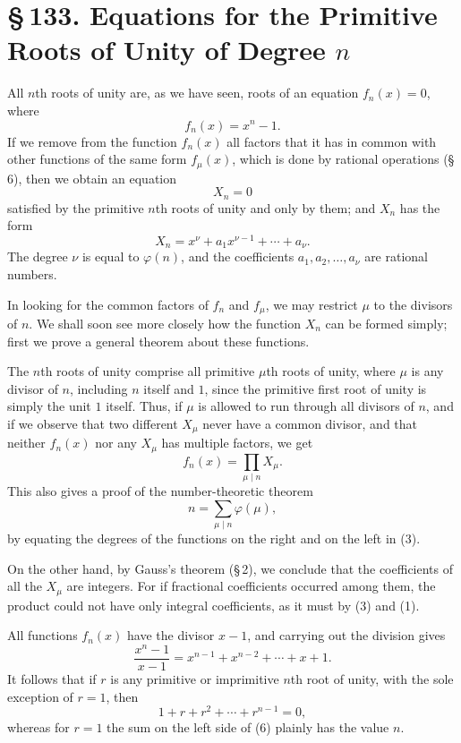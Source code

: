 \documentclass[11pt]{article}
\providecommand{\sect}[2]{\section*{\S\,#1. #2}}
\begin{document}
\sect{133}{Equations for the Primitive Roots of Unity of Degree $n$}

All $n$th roots of unity are, as we have seen, roots of an equation $f_n(x)=0$, where
\[
\tag{1}        f_n(x)=x^n-1.
\]
If we remove from the function $f_n(x)$ all factors that it has in common with other functions of the same form $f_\mu(x)$, which is done by rational operations (\S\,6), then we obtain an equation
\[
        X_n=0
\]
satisfied by the primitive $n$th roots of unity and only by them; and $X_n$ has the form
\[
\tag{2}        X_n=x^\nu+a_1x^{\nu-1}+\cdots+a_\nu.
\]
The degree $\nu$ is equal to $\varphi(n)$, and the coefficients $a_1,a_2,\ldots,a_\nu$ are rational numbers.

In looking for the common factors of $f_n$ and $f_\mu$, we may restrict $\mu$ to the divisors of $n$. We shall soon see more closely how the function $X_n$ can be formed simply; first we prove a general theorem about these functions.

The $n$th roots of unity comprise all primitive $\mu$th roots of unity, where $\mu$ is any divisor of $n$, including $n$ itself and $1$, since the primitive first root of unity is simply the unit $1$ itself. Thus, if $\mu$ is allowed to run through all divisors of $n$, and if we observe that two different $X_\mu$ never have a common divisor, and that neither $f_n(x)$ nor any $X_\mu$ has multiple factors, we get
\[
\tag{3}        f_n(x)=\prod_{\mu\mid n}X_\mu.
\]
This also gives a proof of the number-theoretic theorem
\[
\tag{4}        n=\sum_{\mu\mid n}\varphi(\mu),
\]
by equating the degrees of the functions on the right and on the left in (3).

On the other hand, by Gauss's theorem (\S\,2), we conclude that the coefficients of all the $X_\mu$ are integers. For if fractional coefficients occurred among them, the product could not have only integral coefficients, as it must by (3) and (1).

All functions $f_n(x)$ have the divisor $x-1$, and carrying out the division gives
\[
\tag{5}        \frac{x^n-1}{x-1}=x^{n-1}+x^{n-2}+\cdots+x+1.
\]
It follows that if $r$ is any primitive or imprimitive $n$th root of unity, with the sole exception of $r=1$, then
\[
\tag{6}        1+r+r^2+\cdots+r^{n-1}=0,
\]
whereas for $r=1$ the sum on the left side of (6) plainly has the value $n$.
\end{document}
